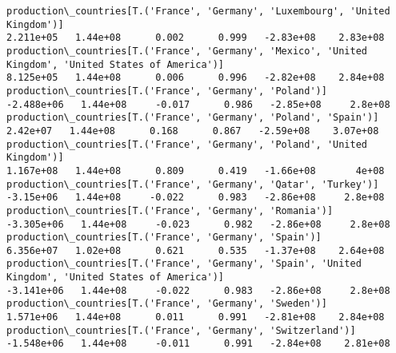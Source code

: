 \documentclass[11pt]{article}
\begin{document}
\begin{Verbatim}[commandchars=\\\{\}]
production\_countries[T.('France', 'Germany', 'Luxembourg', 'United Kingdom')]                                                                                                          2.211e+05   1.44e+08      0.002      0.999   -2.83e+08    2.83e+08
production\_countries[T.('France', 'Germany', 'Mexico', 'United Kingdom', 'United States of America')]                                                                                  8.125e+05   1.44e+08      0.006      0.996   -2.82e+08    2.84e+08
production\_countries[T.('France', 'Germany', 'Poland')]                                                                                                                               -2.488e+06   1.44e+08     -0.017      0.986   -2.85e+08     2.8e+08
production\_countries[T.('France', 'Germany', 'Poland', 'Spain')]                                                                                                                        2.42e+07   1.44e+08      0.168      0.867   -2.59e+08    3.07e+08
production\_countries[T.('France', 'Germany', 'Poland', 'United Kingdom')]                                                                                                              1.167e+08   1.44e+08      0.809      0.419   -1.66e+08       4e+08
production\_countries[T.('France', 'Germany', 'Qatar', 'Turkey')]                                                                                                                       -3.15e+06   1.44e+08     -0.022      0.983   -2.86e+08     2.8e+08
production\_countries[T.('France', 'Germany', 'Romania')]                                                                                                                              -3.305e+06   1.44e+08     -0.023      0.982   -2.86e+08     2.8e+08
production\_countries[T.('France', 'Germany', 'Spain')]                                                                                                                                 6.356e+07   1.02e+08      0.621      0.535   -1.37e+08    2.64e+08
production\_countries[T.('France', 'Germany', 'Spain', 'United Kingdom', 'United States of America')]                                                                                  -3.141e+06   1.44e+08     -0.022      0.983   -2.86e+08     2.8e+08
production\_countries[T.('France', 'Germany', 'Sweden')]                                                                                                                                1.571e+06   1.44e+08      0.011      0.991   -2.81e+08    2.84e+08
production\_countries[T.('France', 'Germany', 'Switzerland')]                                                                                                                          -1.548e+06   1.44e+08     -0.011      0.991   -2.84e+08    2.81e+08

\end{Verbatim}
\end{document}
